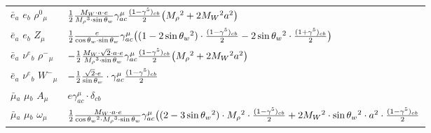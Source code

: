 \begin{center}
\begin{tabular}{|l|l|}
$\bar{e}{}_{a }$ \phantom{-} $e{}_{b }$ \phantom{-} $\rho^0{}_{\mu }$ \phantom{-}  &
	$\frac{1}{2}\frac{ M_W \cdot a \cdot e}{ M_\rho{}^3  \cdot \sin{\theta}_w}\gamma_{a c}^\mu {(1-\gamma^5)_{c b}\over 2} \big( M_\rho{}^2 +2 M_W{}^2  a{}^2 \big)$\\[2mm]
$\bar{e}{}_{a }$ \phantom{-} $e{}_{b }$ \phantom{-} ${Z}_{\mu }$ \phantom{-}  &
	$\frac{1}{2}\frac{ e}{ \cos{\theta}_w \cdot \sin{\theta}_w}\gamma_{a c}^\mu \big( (1-2 \sin{\theta}_w {}^2)\cdot {(1-\gamma^5)_{c b}\over 2} -2 \sin{\theta}_w{}^2 \cdot {(1+\gamma^5)_{c b}\over 2} \big)$\\[2mm]
$\bar{e}{}_{a }$ \phantom{-} $\nu^e{}_{b }$ \phantom{-} $\rho^-{}_{\mu }$ \phantom{-}  &
	$-\frac{1}{2}\frac{ M_W \cdot\sqrt{2} \cdot a \cdot e}{ M_\rho{}^3  \cdot \sin{\theta}_w}\gamma_{a c}^\mu {(1-\gamma^5)_{c b}\over 2} \big( M_\rho{}^2 +2 M_W{}^2  a{}^2 \big)$\\[2mm]
$\bar{e}{}_{a }$ \phantom{-} $\nu^e{}_{b }$ \phantom{-} $W^-{}_{\mu }$ \phantom{-}  &
	$-\frac{1}{2}\frac{\sqrt{2} \cdot e}{ \sin{\theta}_w}\cdot \gamma_{a c}^\mu {(1-\gamma^5)_{c b}\over 2} $\\[2mm]
$\bar{\mu}{}_{a }$ \phantom{-} $\mu{}_{b }$ \phantom{-} ${A}_{\mu }$ \phantom{-}  &
	$ e\gamma_{a c}^\mu \cdot \delta_{c b} $\\[2mm]
$\bar{\mu}{}_{a }$ \phantom{-} $\mu{}_{b }$ \phantom{-} $\omega{}_{\mu }$ \phantom{-}  &
	$\frac{1}{2}\frac{ M_W \cdot a \cdot e}{ \cos{\theta}_w{}^2  \cdot M_\rho{}^3  \cdot \sin{\theta}_w}\gamma_{a c}^\mu \big( (2-3 \sin{\theta}_w {}^2)\cdot  M_\rho{}^2 \cdot {(1-\gamma^5)_{c b}\over 2} +2 M_W{}^2 \cdot  \sin{\theta}_w{}^2 \cdot  a{}^2 \cdot {(1-\gamma^5)_{c b}\over 2} $\\ \hline
\end{tabular}


\end{center}
